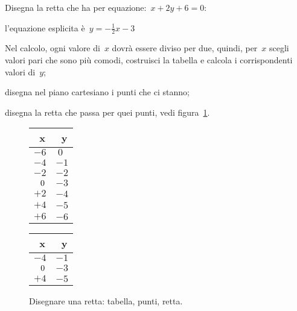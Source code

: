\begin{esempio}
 Disegna la retta che ha per equazione:~\(x+2y+6=0\):
 \begin{enumeratea}
  \item l'equazione esplicita è~\(y=- \frac{1}{2}x - 3\)
  \item Nel calcolo, ogni valore di~\(x\) dovrà essere diviso per due, 
   quindi, per~\(x\) scegli valori pari che sono più comodi, costruisci la 
   tabella e calcola i corrispondenti valori di~\(y\);
  \item disegna nel piano cartesiano i punti che ci stanno;
  \item disegna la retta che passa per quei punti, 
   vedi figura~\ref{fig:retta02}.
 \end{enumeratea}
\end{esempio}

\begin{inaccessibleblock}
 \begin{figure}[h]
 \centering
 \begin{minipage}[]{.18\textwidth}
  \begin{center}
   \begin{tabular}{l|l}
    ~x  & ~y \\
    \hline
    \(-6\) & \(~0\) \\
    \(-4\) & \(-1\) \\
    \(-2\) & \(-2\) \\
    \(\hspace{2.6mm} 0\) & \(-3\) \\
    \(+2\) & \(-4\) \\
    \(+4\) & \(-5\) \\
    \(+6\) & \(-6\) 
   \end{tabular}
   
   \vspace{5mm}
   \begin{tabular}{l|l}
    ~x  & ~y \\
    \hline
    \(-4\) & \(-1\) \\
    \(\hspace{2.7mm} 0\) & \(-3\) \\
    \(+4\) & \(-5\) 
   \end{tabular}
  \end{center}
 \end{minipage}
 \begin{minipage}[]{.40\textwidth}
  \begin{center} \puntib \end{center}
 \end{minipage}
 \begin{minipage}[]{.40\textwidth}
  \begin{center} \rettab \end{center}
 \end{minipage}
  \caption{Disegnare una retta: tabella, punti, retta.}\label{fig:retta02}
\end{figure}
\end{inaccessibleblock}

